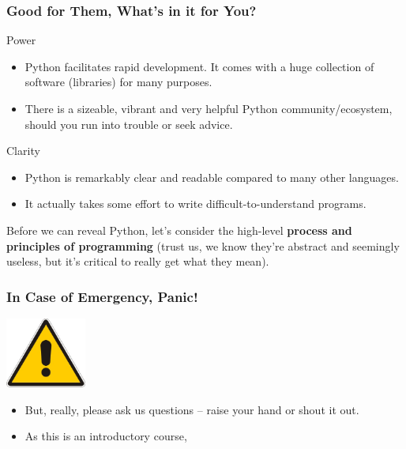 \documentclass[10pt]{beamer}
\begin{document}
\begin{frame}
  \frametitle{Good for Them, What's in it for You?}
  \begin{block}{Power}
    \begin{itemize}
      \item Python facilitates rapid development.
        It comes with a huge collection of software (libraries) for many purposes.
      \item There is a sizeable, vibrant and very helpful Python community/ecosystem, should you run into trouble or seek advice.
    \end{itemize}
  \end{block}
  \begin{block}{Clarity}
    \begin{itemize}
      \item Python is remarkably clear and readable compared to many other languages.
      \item It actually takes some effort to write difficult-to-understand programs.
    \end{itemize}
  \end{block}
  Before we can reveal Python, let's consider the high-level \textbf{process and principles of programming} (trust us, we know they're abstract and seemingly useless, but it's critical to really get what they mean).
\end{frame}

\begin{frame}
  \frametitle{In Case of Emergency, Panic!}
  \begin{center}
    \includegraphics[width=100px]{AlertSign.jpg}
  \end{center}
  \begin{itemize}
    \item But, really, please ask us questions -- raise your hand or shout it out.
    \item As this is an introductory course, 
  \end{itemize}
\end{frame}
\end{document}
